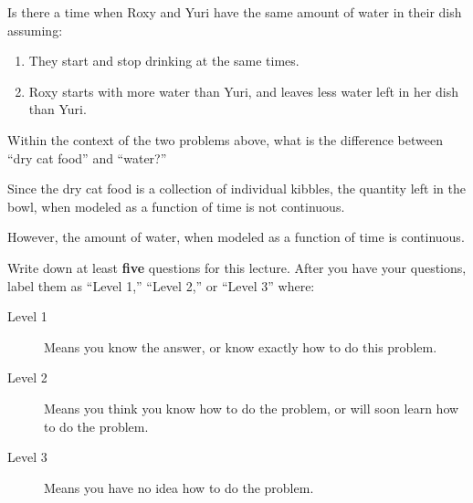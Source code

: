 \documentclass{ximera}
\begin{document}
\begin{problem}
  Is there a time when Roxy and Yuri have the same amount of water in
  their dish assuming:
  \begin{enumerate}
  \item They start and stop drinking at the same times.
  \item Roxy starts with more water than Yuri, and leaves less water
    left in her dish than Yuri.
  \end{enumerate}
    \begin{multipleChoice}
  \end{multipleChoice}
\end{problem}



\begin{problem}
  Within the context of the two problems above, what is the difference
  between ``dry cat food'' and ``water?''
  \begin{freeResponse}
    Since the dry cat food is a collection of individual kibbles, the
    quantity left in the bowl, when modeled as a function of time is
    not continuous.

    However, the amount of water, when modeled as a function of time
    is continuous. 
  \end{freeResponse}
\end{problem}



\begin{xarmaBoost}
  Write down at least \textbf{five} questions for this lecture. After
  you have your questions, label them as ``Level 1,'' ``Level 2,'' or
  ``Level 3'' where:
\begin{description}
\item[Level 1] Means you know the answer, or know exactly how to do
  this problem.
\item[Level 2] Means you think you know how to do the problem, or will
  soon learn how to do the problem.
\item[Level 3] Means you have no idea how to do the problem.
\end{description}
\begin{freeResponse}
\end{freeResponse}
\end{xarmaBoost}
\end{document}
